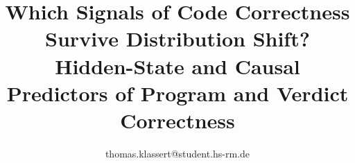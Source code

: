 \documentclass[10pt,conference]{IEEEtran}
\begin{document}

\title{Which Signals of Code Correctness Survive Distribution Shift? Hidden-State and Causal Predictors of Program and Verdict Correctness}




\author{
 thomas.klassert@student.hs-rm.de
}
\end{document}
